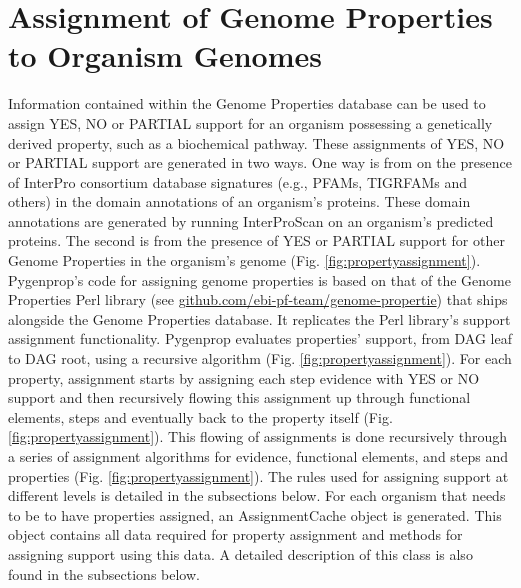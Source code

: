 \section{Assignment of Genome Properties to Organism Genomes}

Information contained within the Genome Properties database can be used to assign YES, NO or PARTIAL support for an organism possessing a genetically derived property, such as a biochemical pathway. These assignments of YES, NO or PARTIAL support are generated in two ways. One way is from on the presence of InterPro consortium database signatures (e.g., PFAMs, TIGRFAMs and others) in the domain annotations of an organism's proteins. These domain annotations are generated by running InterProScan \cite{jones2014interproscan} on an organism's predicted proteins. The second is from the presence of YES or PARTIAL support for other Genome Properties in the organism's genome (Fig. \ref{fig:propertyassignment}). Pygenprop's code for assigning genome properties is based on that of the Genome Properties Perl library (see \href{github.com/ebi-pf-team/genome-properties}{github.com/ebi-pf-team/genome-propertie}) that ships alongside the Genome Properties database. It replicates the Perl library's support assignment functionality. Pygenprop evaluates properties' support, from DAG leaf to DAG root, using a recursive algorithm (Fig. \ref{fig:propertyassignment}). For each property, assignment starts by assigning each step evidence with YES or NO support and then recursively flowing this assignment up through functional elements, steps and eventually back to the property itself (Fig. \ref{fig:propertyassignment}). This flowing of assignments is done recursively through a series of assignment algorithms for evidence, functional elements, and steps and properties (Fig. \ref{fig:propertyassignment}). The rules used for assigning support at different levels is detailed in the subsections below. For each organism that needs to be to have properties assigned, an AssignmentCache object is generated. This object contains all data required for property assignment and methods for assigning support using this data. A detailed description of this class is also found in the subsections below.

